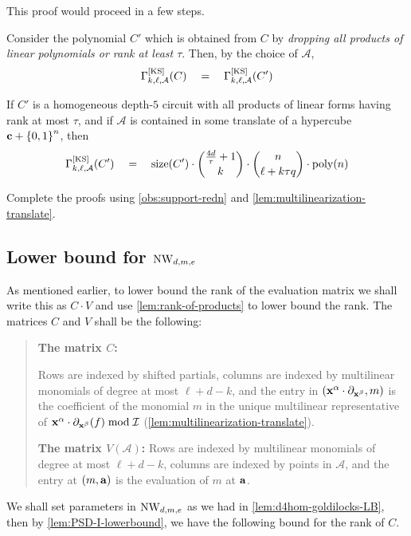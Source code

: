 This proof would proceed in a few steps. 

\begin{claim}
Consider the polynomial $C'$ which is obtained from $C$ by \emph{dropping all products of linear polynomials or rank at least $\tau$}. Then, by the choice of $\mathcal{A}$,
\[
\Gamma^{\mathrm{[KS]}}_{k,\ell,\mathcal{A}}(C) \quad = \quad\Gamma^{\mathrm{[KS]}}_{k,\ell,\mathcal{A}}(C')
\]
\end{claim}

\begin{claim}
  If $C'$ is a homogeneous depth-$5$ circuit with all products of linear forms having rank at most $\tau$, and if $\mathcal{A}$ is contained in some translate of a hypercube $\mathbf{c} + \left\{0,1\right\}^n$, then
\[
\Gamma^{\mathrm{[KS]}}_{k,\ell,\mathcal{A}}(C') \quad = \quad \mathrm{size}(C') \cdot \binom{\frac{4d}{\tau} + 1}{k} \cdot \binom{n}{\ell + k\tau q} \cdot \operatorname{poly}(n)
\]
\end{claim}

\begin{exercise}
Complete the proofs using \autoref{obs:support-redn} and \autoref{lem:multilinearization-translate}. 
\end{exercise}

\subsection{Lower bound for $\operatorname{\mathrm{NW}}_{d,m,e}$}

As mentioned earlier, to lower bound the rank of the evaluation matrix we shall write this as $C \cdot V$ and use \autoref{lem:rank-of-products} to lower bound the rank. The matrices $C$ and $V$ shall be the following:
\begin{quote}
{\bf The matrix $C$:}

Rows are indexed by shifted partials, columns are indexed by multilinear monomials of degree at most $\ell + d - k$, and the entry in $(\mathbf{x}^{\alpha} \cdot \partial_{\mathbf{x}^{\beta}} , m)$ is the coefficient of the monomial $m$ in the unique multilinear representative of $\mathbf{x}^{\alpha} \cdot \partial_{\mathbf{x}^{\beta}}(f) \bmod{\mathcal{I}}$ (\autoref{lem:multilinearization-translate}). 

{\bf The matrix $V({\mathcal{A}})$:}
Rows are indexed by multilinear monomials of degree at most $\ell + d - k$, columns are indexed by points in $\mathcal{A}$, and the entry at $(m,\mathbf{a})$ is the evaluation of $m$ at $\mathbf{a}$. 
\end{quote}

We shall set parameters in $\operatorname{\mathrm{NW}}_{d,m,e}$ as we had in \autoref{lem:d4hom-goldilocks-LB}, then by \autoref{lem:PSD-I-lowerbound}, we have the following bound for the rank of $C$.

